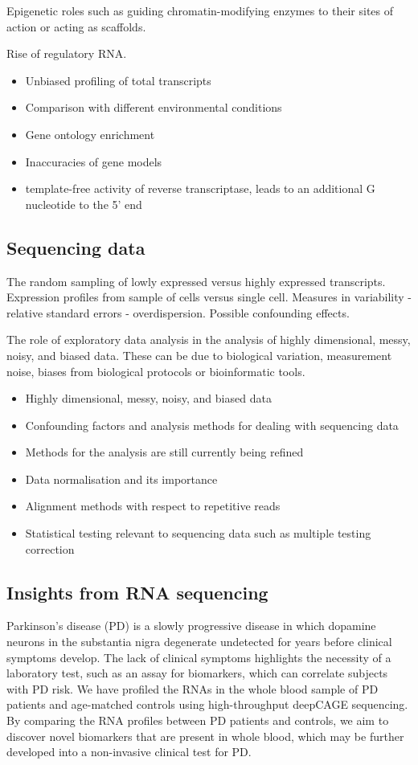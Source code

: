Epigenetic roles such as guiding chromatin-modifying enzymes to their sites of action or acting as scaffolds.

Rise of regulatory RNA\cite{Morris2014}.

\begin{itemize}
   \item Unbiased profiling of total transcripts
   \item Comparison with different environmental conditions
   \item Gene ontology enrichment
   \item Inaccuracies of gene models
   \item template-free activity of reverse transcriptase, leads to an additional G nucleotide to the 5' end
\end{itemize}

\subsection{Sequencing data}

The random sampling of lowly expressed versus highly expressed transcripts. Expression profiles from sample of cells versus single cell. Measures in variability - relative standard errors - overdispersion. Possible confounding effects.

The role of exploratory data analysis in the analysis of highly dimensional, messy, noisy, and biased data. These can be due to biological variation, measurement noise, biases from biological protocols or bioinformatic tools.

\begin{itemize}
   \item Highly dimensional, messy, noisy, and biased data
   \item Confounding factors and analysis methods for dealing with sequencing data
   \item Methods for the analysis are still currently being refined
   \item Data normalisation and its importance
   \item Alignment methods with respect to repetitive reads
   \item Statistical testing relevant to sequencing data such as multiple testing correction
\end{itemize}

\subsection{Insights from RNA sequencing}

Parkinson’s disease (PD) is a slowly progressive disease in which dopamine neurons in the substantia nigra degenerate undetected for years before clinical symptoms develop. The lack of clinical symptoms highlights the necessity of a laboratory test, such as an assay for biomarkers, which can correlate subjects with PD risk. We have profiled the RNAs in the whole blood sample of PD patients and age-matched controls using high-throughput deepCAGE sequencing. By comparing the RNA profiles between PD patients and controls, we aim to discover novel biomarkers that are present in whole blood, which may be further developed into a non-invasive clinical test for PD.

